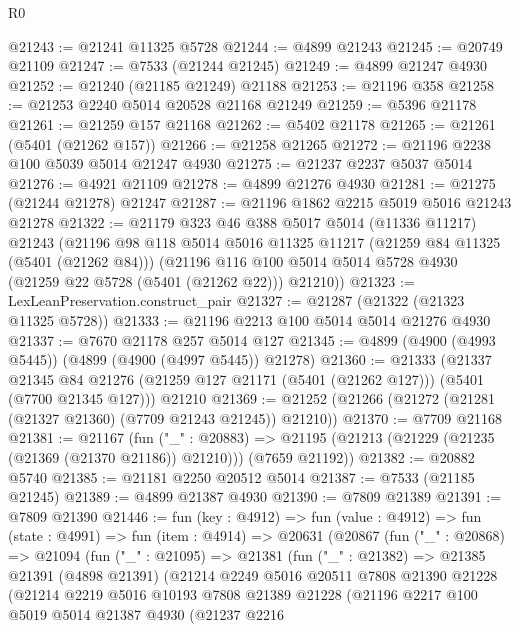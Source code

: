 \begin{lexlean}{R0}
\begin{coremodule}
@21243 := @21241 @11325 @5728
@21244 := @4899 @21243
@21245 := @20749 @21109
@21247 := @7533 (@21244 @21245)
@21249 := @4899 @21247 @4930
@21252 := @21240 (@21185 @21249) @21188
@21253 := @21196 @358
@21258 := @21253 @2240 @5014 @20528 @21168 @21249
@21259 := @5396 @21178
@21261 := @21259 @157 @21168
@21262 := @5402 @21178
@21265 := @21261 (@5401 (@21262 @157))
@21266 := @21258 @21265
@21272 := @21196 @2238 @100 @5039 @5014 @21247 @4930
@21275 := @21237 @2237 @5037 @5014
@21276 := @4921 @21109
@21278 := @4899 @21276 @4930
@21281 := @21275 (@21244 @21278) @21247
@21287 := @21196 @1862 @2215 @5019 @5016 @21243 @21278
@21322 := @21179
    @323
    @46
    @388
    @5017
    @5014
    (@11336 @11217)
    @21243
    (@21196
      @98
      @118
      @5014
      @5016
      @11325
      @11217
      (@21259 @84 @11325 (@5401 (@21262 @84)))
      (@21196 @116 @100 @5014 @5014 @5728 @4930 (@21259 @22 @5728 (@5401 (@21262 @22))) @21210))
@21323 := LexLeanPreservation.construct_pair
@21327 := @21287 (@21322 (@21323 @11325 @5728))
@21333 := @21196 @2213 @100 @5014 @5014 @21276 @4930
@21337 := @7670 @21178 @257 @5014 @127
@21345 := @4899 (@4900 (@4993 @5445)) (@4899 (@4900 (@4997 @5445)) @21278)
@21360 := @21333
    (@21337
      @21345
      @84
      @21276
      (@21259 @127 @21171 (@5401 (@21262 @127)))
      (@5401 (@7700 @21345 @127)))
    @21210
@21369 := @21252 (@21266 (@21272 (@21281 (@21327 @21360) (@7709 @21243 @21245)) @21210))
@21370 := @7709 @21168
@21381 := @21167
    (fun ("_" : @20883) =>
    @21195 (@21213 (@21229 (@21235 (@21369 (@21370 @21186)) @21210))) (@7659 @21192))
@21382 := @20882 @5740
@21385 := @21181 @2250 @20512 @5014
@21387 := @7533 (@21185 @21245)
@21389 := @4899 @21387 @4930
@21390 := @7809 @21389
@21391 := @7809 @21390
@21446 := fun (key : @4912) =>
  fun (value : @4912) =>
  fun (state : @4991) =>
  fun (item : @4914) =>
  @20631
    (@20867
      (fun ("_" : @20868) =>
      @21094
        (fun ("_" : @21095) =>
        @21381
          (fun ("_" : @21382) =>
          @21385
            @21391
            (@4898 @21391)
            (@21214
              @2249
              @5016
              @20511
              @7808
              @21390
              @21228
              (@21214
                @2219
                @5016
                @10193
                @7808
                @21389
                @21228
                (@21196
                  @2217
                  @100
                  @5019
                  @5014
                  @21387
                  @4930
                  (@21237
                    @2216

\end{coremodule}
\end{lexlean}
